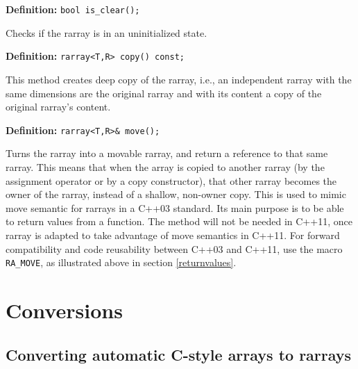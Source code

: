 \documentclass[11pt,twoside]{article}
\begin{document}
\noindent\textbf{Definition:} \texttt{bool is\_clear();}

Checks if the rarray is in an uninitialized state.

\noindent\textbf{Definition:} \texttt{rarray{\tt<}T,R{\tt>} copy() const;}

This method creates deep copy of the rarray, i.e., an independent rarray with the same dimensions are the original rarray and with its content a copy of the original rarray's content.


\noindent\textbf{Definition:} \texttt{rarray{\tt<}T,R{\tt>}\& move();}

Turns the rarray into a movable rarray, and return a reference to that same rarray. This means that when the array is copied to another rarray (by the assignment operator or by a copy constructor), that other rarray becomes the owner of the rarray, instead of a shallow, non-owner copy.  This is used to mimic move semantic for rarrays in a C++03 standard. Its main purpose is to be able to return values from a function.  The method will not be needed in C++11, once rarray is adapted to take advantage of move semantics in C++11. For forward compatibility and code reusability between C++03 and C++11, use the macro \texttt{RA\_MOVE}, as illustrated above in section \ref{returnvalues}.

\pagebreak
\section{Conversions}

\subsection{Converting automatic C-style arrays to rarrays}
\end{document}
